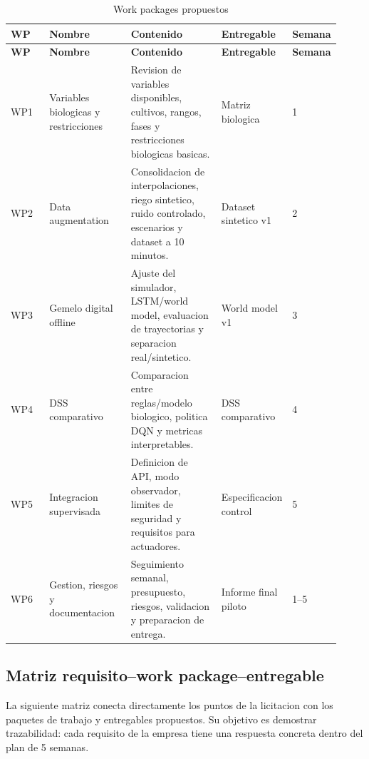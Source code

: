 ﻿\documentclass[11pt,a4paper]{article}
\begin{document}
\begin{longtable}{p{0.12\linewidth}p{0.25\linewidth}p{0.28\linewidth}p{0.17\linewidth}p{0.10\linewidth}}
\caption{Work packages propuestos}\\
\toprule
\textbf{WP} & \textbf{Nombre} & \textbf{Contenido} & \textbf{Entregable} & \textbf{Semana} \\
\midrule
\endfirsthead
\toprule
\textbf{WP} & \textbf{Nombre} & \textbf{Contenido} & \textbf{Entregable} & \textbf{Semana} \\
\midrule
\endhead
WP1 & Variables biologicas y restricciones & Revision de variables disponibles, cultivos, rangos, fases y restricciones biologicas basicas. & Matriz biologica & 1 \\ \addlinespace
WP2 & Data augmentation & Consolidacion de interpolaciones, riego sintetico, ruido controlado, escenarios y dataset a 10 minutos. & Dataset sintetico v1 & 2 \\ \addlinespace
WP3 & Gemelo digital offline & Ajuste del simulador, LSTM/world model, evaluacion de trayectorias y separacion real/sintetico. & World model v1 & 3 \\ \addlinespace
WP4 & DSS comparativo & Comparacion entre reglas/modelo biologico, politica DQN y metricas interpretables. & DSS comparativo & 4 \\ \addlinespace
WP5 & Integracion supervisada & Definicion de API, modo observador, limites de seguridad y requisitos para actuadores. & Especificacion control & 5 \\ \addlinespace
WP6 & Gestion, riesgos y documentacion & Seguimiento semanal, presupuesto, riesgos, validacion y preparacion de entrega. & Informe final piloto & 1--5 \\
\bottomrule
\end{longtable}

\subsection{Matriz requisito--work package--entregable}

La siguiente matriz conecta directamente los puntos de la licitacion con los paquetes de trabajo y entregables propuestos. Su objetivo es demostrar trazabilidad: cada requisito de la empresa tiene una respuesta concreta dentro del plan de 5 semanas.
\end{document}
